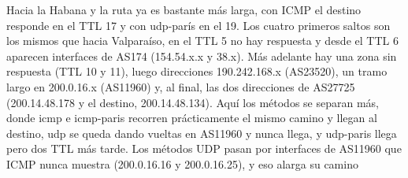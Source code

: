 
Hacia la Habana y la ruta ya es bastante más larga, con ICMP el destino responde en el TTL 17 y con udp-parís en el 19. Los cuatro primeros saltos son los mismos que hacia Valparaíso, en el TTL 5 no hay respuesta y desde el TTL 6 aparecen interfaces de AS174 (154.54.x.x y 38.x). Más adelante hay una zona sin respuesta (TTL 10 y 11), luego direcciones 190.242.168.x (AS23520), un tramo largo en 200.0.16.x (AS11960) y, al final, las dos direcciones de AS27725 (200.14.48.178 y el destino, 200.14.48.134).
Aquí los métodos se separan más, donde icmp e icmp-paris recorren prácticamente el mismo camino y llegan al destino, udp se queda dando vueltas en AS11960 y nunca llega, y udp-paris llega pero dos TTL más tarde. Los métodos UDP pasan por interfaces de AS11960 que ICMP nunca muestra (200.0.16.16 y 200.0.16.25), y eso alarga su camino

